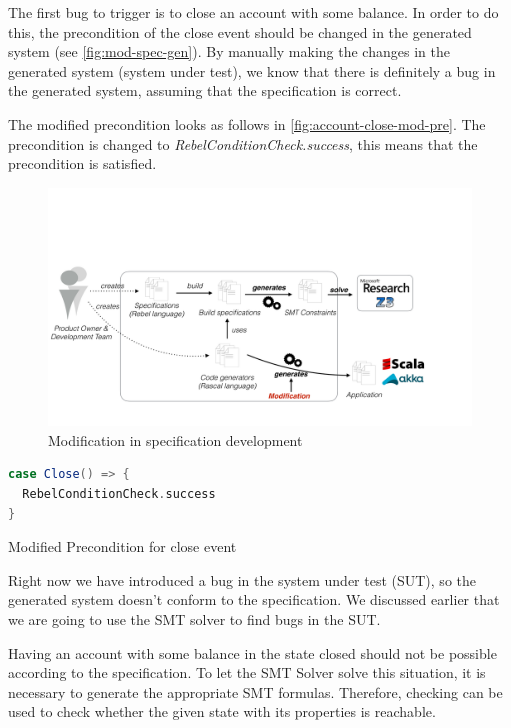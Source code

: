 The first bug to trigger is to close an account with some balance. In order to do this, the precondition of the close event should be changed in the generated system (see \autoref{fig:mod-spec-gen}). By manually making the changes in the generated system (system under test), we know that there is definitely a bug in the generated system, assuming that the specification is correct.

The modified precondition looks as follows in \autoref{fig:account-close-mod-pre}. The precondition is changed to \textit{RebelConditionCheck.success}, this means that the precondition is satisfied.

\begin{figure}[h!]
  \centering
  \includegraphics[scale=0.26]{figures/mod-generated.pdf}
  \caption{Modification in specification development}\label{fig:mod-spec-gen}
\end{figure}
\FloatBarrier

\begin{sourcecode}[h!]
\begin{lstlisting}[language=scala]
case Close() => {
  RebelConditionCheck.success
}
\end{lstlisting}
\caption{Modified Precondition for close event}\label{fig:account-close-mod-pre}
\end{sourcecode}
\FloatBarrier

Right now we have introduced a bug in the system under test (SUT), so the
generated system doesn't conform to the specification. We discussed earlier that
we are going to use the SMT solver to find bugs in the SUT.

Having an account with some balance in the state closed should not be possible
according to the specification. To let the SMT Solver solve this situation, it
is necessary to generate the appropriate SMT formulas. Therefore, checking can
be used to check whether the given state with its properties is reachable.

